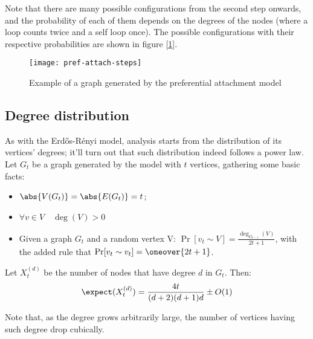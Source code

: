 Note that there are many possible configurations from the second step onwards, and the probability of each of them depends on the degrees of the nodes (where a loop counts twice and a self loop once). The possible configurations with their respective probabilities are shown in figure [\ref{fig:pref-att-steps}].

\begin{figure}[ht]
    \centering
    \texttt{[image: pref-attach-steps]}
    \caption{Example of a graph generated by the preferential attachment model}
    \label{fig:pref-att-steps}
\end{figure}


\subsection{Degree distribution}\label{sec:pref-attach-degree}

As with the Erd\H{o}s-Rényi model, analysis starts from the distribution of its vertices' degrees; it'll turn out that such distribution indeed follows a power law. Let $G_t$ be a graph generated by the model with $t$ vertices, gathering some basic facts:
       
\begin{itemize}
    \item $\abs{V(G_t)} = \abs{E(G_t)} = t$;
    \item $\forall v \in V \quad \deg(V) > 0$
    \item Given a graph $G_t$ and a random vertex V: $\Pr[v_t \sim V] = \frac{\deg_{G_{t - 1}}(V)}{2t + 1}$, with the added rule that $\Pr[v_t \sim v_t] = \oneover{2t + 1}$.
\end{itemize}
    
\begin{theorem}\label{thm:pref-attach-degree}
    Let $X_t^{(d)}$ be the number of nodes that have degree $d$ in $G_t$. Then:
    \[
        \expect(X_t^{(d)}) = \frac{4 t}{(d + 2)(d + 1)d} \pm O(1)
    \]
\end{theorem}

\begin{observation}
    Note that, as the degree grows arbitrarily large, the number of vertices having such degree drop cubically.
\end{observation}
    
